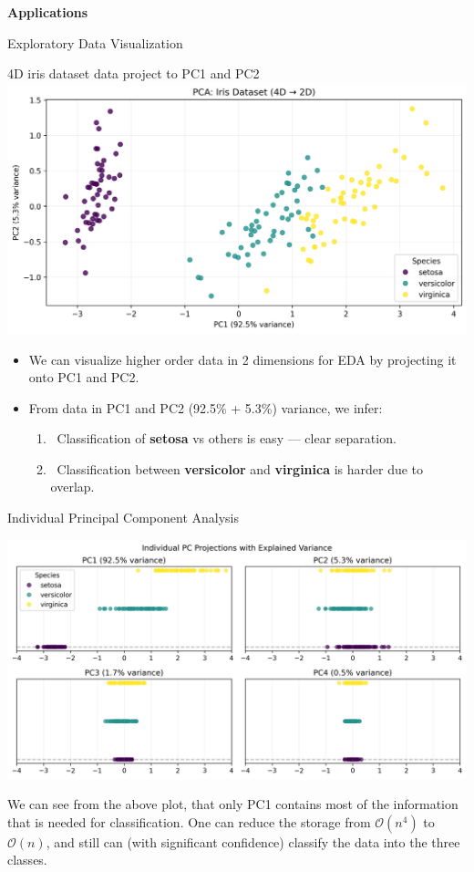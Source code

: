 \documentclass{beamer}
\begin{document}

\begin{frame}{}
    \LARGE \centering \textbf{Applications}
\end{frame}

\begin{frame}{Exploratory Data Visualization}
    \begin{center}
        \scriptsize{4D iris dataset data project to PC1 and PC2}
        \includegraphics[width=0.65\linewidth]{images/pca/4D_to_2D.png} \\
    \end{center}

    \begin{itemize}
        \item We can visualize higher order data in 2 dimensions for EDA by projecting it onto PC1 and PC2.
        \item From data in PC1 and PC2 (92.5\% + 5.3\%) variance, we infer:
        \begin{enumerate}
            \item \checkmark \ Classification of \textbf{setosa} vs others is easy — clear separation. 
            \item \checkmark \ Classification between \textbf{versicolor} and \textbf{virginica} is harder due to overlap.
        \end{enumerate}
    \end{itemize}
\end{frame}


\begin{frame}{Individual Principal Component Analysis}
    \begin{center}
        \includegraphics[width=0.8\linewidth]{images/pca/components.png} \\
    \end{center}

    We can see from the above plot, that only PC1 contains most of the information that is needed for classification. One can reduce the storage from $\mathcal{O}(n^4)$ to $\mathcal{O}(n)$, and still can (with significant confidence) classify the data into the three classes. 
\end{frame}
\end{document}
